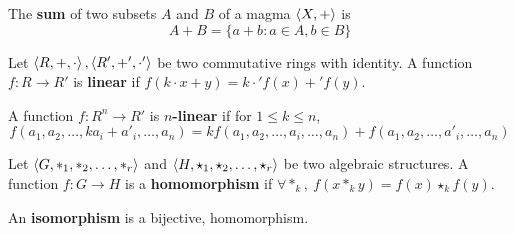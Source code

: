 \begin{definition}
	The \textbf{sum} of two subsets $A$ and $B$ of a magma $\left\langle X,+ \right\rangle$ is 
	$$A+B = \{ a+b : a \in A, b \in B \}$$
\end{definition}

\begin{definition}
	Let $\left\langle R,+,\cdot \right\rangle,\left\langle R',+',\cdot' \right\rangle$ be two commutative rings with identity.
	A function $f : R \to R'$ is \textbf{linear} if $f(k \cdot x+y) = k \cdot' f(x) +' f(y)$.
\end{definition}

\begin{definition}
	A function $f : R^n \to R'$ is \textbf{$n$-linear} if for $1 \le k \le n$,
	\begin{equation*}
		f(a_1,a_2,\dots,ka_i+a'_i,\dots,a_n) = kf(a_1,a_2,\dots,a_i,\dots,a_n) + f(a_1,a_2,\dots,a'_i,\dots,a_n)
	\end{equation*}
\end{definition}

\begin{definition}
	Let $\left\langle G,\ast_1,\ast_2,\dots,\ast_r \right\rangle$ and $\left\langle H,\star_1,\star_2,\dots,\star_r \right\rangle$ be two algebraic structures.
	A function $f : G \to H$ is a \textbf{homomorphism} if $\forall \ast_k,\ f(x \ast_k y) = f(x) \star_k f(y)$.
\end{definition}

\begin{definition}
	An \textbf{isomorphism} is a bijective, homomorphism.
\end{definition}

